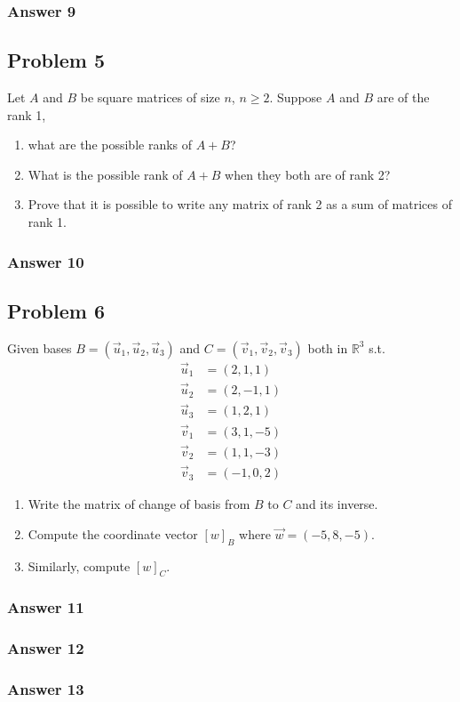 \documentclass[11pt]{article}
\begin{document}
\subsubsection{Answer 9}
\label{sec-1-4-1}

\subsection{Problem 5}
\label{sec-1-5}
Let $A$ and $B$ be square matrices of size $n$, $n \geq 2$.  Suppose $A$ and
$B$ are of the rank 1, 
\begin{enumerate}
\item what are the possible ranks of $A + B$?
\item What is the possible rank of $A + B$ when they both are of rank 2?
\item Prove that it is possible to write any matrix of rank 2 as a sum of
matrices of rank 1.
\end{enumerate}

\subsubsection{Answer 10}
\label{sec-1-5-1}

\subsection{Problem 6}
\label{sec-1-6}
Given bases $B = (\vec{u}_1, \vec{u}_2, \vec{u}_3)$ and $C = (\vec{v}_1,
   \vec{v}_2, \vec{v}_3)$ both in $\mathbb{R}^3$ s.t.
\begin{align*}
  \vec{u}_1 &= (2,1,1) \\
  \vec{u}_2 &= (2,-1,1) \\
  \vec{u}_3 &= (1,2,1) \\
  \vec{v}_1 &= (3,1,-5) \\
  \vec{v}_2 &= (1,1,-3) \\
  \vec{v}_3 &= (-1,0,2)
\end{align*}

\begin{enumerate}
\item Write the matrix of change of basis from $B$ to $C$ and its inverse.
\item Compute the coordinate vector $[w]_B$ where $\vec{w} = (-5,8,-5)$.
\item Similarly, compute $[w]_C$.
\end{enumerate}

\subsubsection{Answer 11}
\label{sec-1-6-1}

\subsubsection{Answer 12}
\label{sec-1-6-2}

\subsubsection{Answer 13}
\label{sec-1-6-3}
\end{document}
